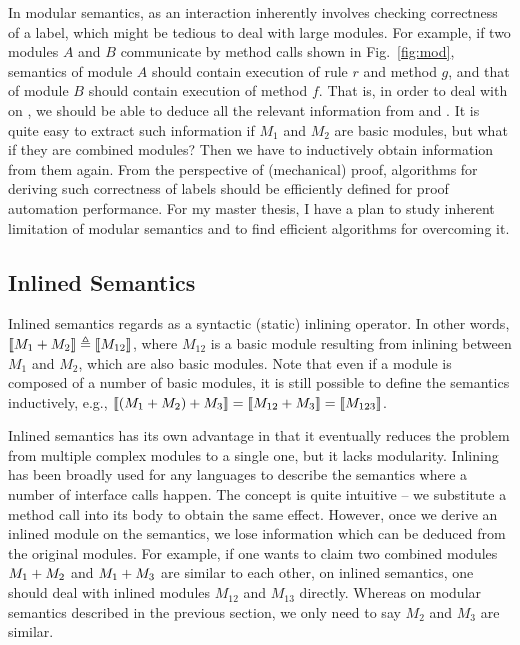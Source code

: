 In modular semantics, \Sem{\ModP{}} as an interaction inherently
involves checking correctness of a label, which might be tedious to
deal with large modules. For example, if two modules $A$ and $B$
communicate by method calls shown in Fig.~\ref{fig:mod}, semantics of
module $A$ should contain execution of rule $r$ and method $g$, and
that of module $B$ should contain execution of method $f$. That is, in
order to deal with \Sem{\ModP{}} on , we should
be able to deduce all the relevant information from  and
. It is quite easy to extract such information if $M_1$ and
$M_2$ are basic modules, but what if they are combined modules? Then
we have to inductively obtain information from them again. From the
perspective of (mechanical) proof, algorithms for deriving such
correctness of labels should be efficiently defined for proof
automation performance. For my master thesis, I have a plan to study
inherent limitation of modular semantics and to find efficient
algorithms for overcoming it.

\subsection{Inlined Semantics}

Inlined semantics regards \ModP{} as a syntactic (static) inlining
operator. In other words, $\llbracket M_1 +{} M_2 \rrbracket \triangleq
\llbracket M_{12} \rrbracket$, where $M_{12}$ is a basic module resulting from
inlining between $M_1$ and $M_2$, which are also basic modules. Note
that even if a module is composed of a number of basic modules, it is
still possible to define the semantics inductively, e.g., $\llbracket (M_1
  +{} M_2) +{} M_3 \rrbracket = \llbracket M_{12} +{} M_3 \rrbracket =
\llbracket M_{123} \rrbracket$.

Inlined semantics has its own advantage in that it eventually reduces
the problem from multiple complex modules to a single one, but it
lacks modularity. Inlining has been broadly used for any languages to
describe the semantics where a number of interface calls happen. The
concept is quite intuitive -- we substitute a method call into its
body to obtain the same effect. However, once we derive an inlined
module on the semantics, we lose information which can be deduced from
the original modules. For example, if one wants to claim two combined
modules $M_1 +{} M_2$ and $M_1 +{} M_3$ are similar to each
other, on inlined semantics, one should deal with inlined modules
$M_{12}$ and $M_{13}$ directly. Whereas on modular semantics described
in the previous section, we only need to say $M_2$ and $M_3$ are
similar.

